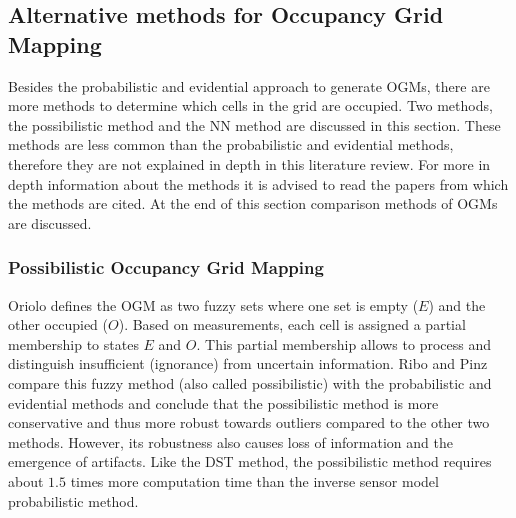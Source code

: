 \newpage

\subsection{Alternative methods for Occupancy Grid Mapping} \label{subsec:alt_OGM}
Besides the probabilistic and evidential approach to generate \glspl{OGM}, there are more methods to determine which cells in the grid are occupied. Two methods, the possibilistic method and the \gls{NN} method are discussed in this section. These methods are less common than the probabilistic and evidential methods, therefore they are not explained in depth in this literature review. For more in depth information about the methods it is advised to read the papers from which the methods are cited. At the end of this section comparison methods of OGMs are discussed. 

\subsubsection{Possibilistic Occupancy Grid Mapping}
Oriolo \cite{oriolo1997fuzzy} defines the \gls{OGM} as two fuzzy sets where one set is empty ($E$) and the other occupied ($O$). Based on measurements, each cell is assigned a partial membership to states $E$ and $O$. This partial membership allows to process and distinguish insufficient (ignorance) from uncertain information. Ribo and Pinz \cite{ribo2001comparison} compare this fuzzy method (also called possibilistic) with the probabilistic and evidential methods and conclude that the possibilistic method is more conservative and thus more robust towards outliers compared to the other two methods. However, its robustness also causes loss of information and the emergence of artifacts. Like the DST method, the possibilistic method requires about $1.5$ times more computation time than the inverse sensor model probabilistic method. 


